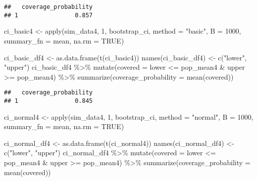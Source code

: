 \documentclass[
]{article}
\newenvironment{Shaded}{\begin{snugshade}}{\end{snugshade}}
\newcommand{\AttributeTok}[1]{\textcolor[rgb]{0.77,0.63,0.00}{#1}}
\newcommand{\ConstantTok}[1]{\textcolor[rgb]{0.00,0.00,0.00}{#1}}
\newcommand{\DecValTok}[1]{\textcolor[rgb]{0.00,0.00,0.81}{#1}}
\newcommand{\FunctionTok}[1]{\textcolor[rgb]{0.00,0.00,0.00}{#1}}
\newcommand{\NormalTok}[1]{#1}
\newcommand{\OtherTok}[1]{\textcolor[rgb]{0.56,0.35,0.01}{#1}}
\newcommand{\SpecialCharTok}[1]{\textcolor[rgb]{0.00,0.00,0.00}{#1}}
\newcommand{\StringTok}[1]{\textcolor[rgb]{0.31,0.60,0.02}{#1}}
\begin{document}
\begin{verbatim}
##   coverage_probability
## 1                0.857
\end{verbatim}

\begin{Shaded}
\begin{Highlighting}[]
\NormalTok{ci\_basic4 }\OtherTok{\textless{}{-}} \FunctionTok{apply}\NormalTok{(sim\_data4, }\DecValTok{1}\NormalTok{, bootstrap\_ci, }\AttributeTok{method =} \StringTok{"basic"}\NormalTok{, }\AttributeTok{B =} \DecValTok{1000}\NormalTok{, }\AttributeTok{summary\_fn =}\NormalTok{ mean, }\AttributeTok{na.rm =} \ConstantTok{TRUE}\NormalTok{)}

\NormalTok{ci\_basic\_df4 }\OtherTok{\textless{}{-}} \FunctionTok{as.data.frame}\NormalTok{(}\FunctionTok{t}\NormalTok{(ci\_basic4))}
\FunctionTok{names}\NormalTok{(ci\_basic\_df4) }\OtherTok{\textless{}{-}} \FunctionTok{c}\NormalTok{(}\StringTok{"lower"}\NormalTok{, }\StringTok{"upper"}\NormalTok{)}
\NormalTok{ci\_basic\_df4 }\SpecialCharTok{\%\textgreater{}\%} \FunctionTok{mutate}\NormalTok{(}\AttributeTok{covered =}\NormalTok{ lower }\SpecialCharTok{\textless{}=}\NormalTok{ pop\_mean4 }\SpecialCharTok{\&}\NormalTok{ upper }\SpecialCharTok{\textgreater{}=}\NormalTok{ pop\_mean4) }\SpecialCharTok{\%\textgreater{}\%}
  \FunctionTok{summarize}\NormalTok{(}\AttributeTok{coverage\_probability =} \FunctionTok{mean}\NormalTok{(covered))}
\end{Highlighting}
\end{Shaded}

\begin{verbatim}
##   coverage_probability
## 1                0.845
\end{verbatim}

\begin{Shaded}
\begin{Highlighting}[]
\NormalTok{ci\_normal4 }\OtherTok{\textless{}{-}} \FunctionTok{apply}\NormalTok{(sim\_data4, }\DecValTok{1}\NormalTok{, bootstrap\_ci, }\AttributeTok{method =} \StringTok{"normal"}\NormalTok{, }\AttributeTok{B =} \DecValTok{1000}\NormalTok{, }\AttributeTok{summary\_fn =}\NormalTok{ mean, }\AttributeTok{na.rm =} \ConstantTok{TRUE}\NormalTok{)}

\NormalTok{ci\_normal\_df4 }\OtherTok{\textless{}{-}} \FunctionTok{as.data.frame}\NormalTok{(}\FunctionTok{t}\NormalTok{(ci\_normal4))}
\FunctionTok{names}\NormalTok{(ci\_normal\_df4) }\OtherTok{\textless{}{-}} \FunctionTok{c}\NormalTok{(}\StringTok{"lower"}\NormalTok{, }\StringTok{"upper"}\NormalTok{)}
\NormalTok{ci\_normal\_df4 }\SpecialCharTok{\%\textgreater{}\%} \FunctionTok{mutate}\NormalTok{(}\AttributeTok{covered =}\NormalTok{ lower }\SpecialCharTok{\textless{}=}\NormalTok{ pop\_mean4 }\SpecialCharTok{\&}\NormalTok{ upper }\SpecialCharTok{\textgreater{}=}\NormalTok{ pop\_mean4) }\SpecialCharTok{\%\textgreater{}\%}
  \FunctionTok{summarize}\NormalTok{(}\AttributeTok{coverage\_probability =} \FunctionTok{mean}\NormalTok{(covered))}
\end{Highlighting}
\end{Shaded}
\end{document}
